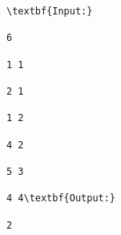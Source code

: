 \begin{verbatim}
\textbf{Input:}

6

1 1

2 1

1 2

4 2

5 3

4 4\textbf{Output:}

2

\end{verbatim}
